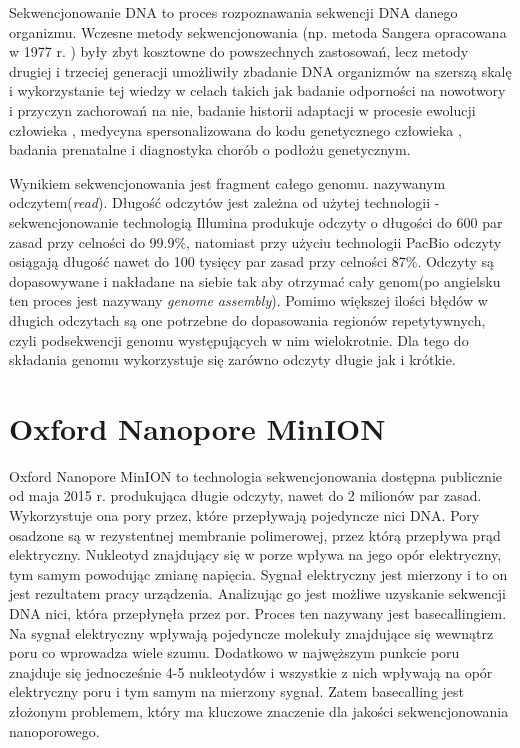 \documentclass[a4paper,11pt,twoside]{report}
\theoremstyle{definition}
\begin{document}
Sekwencjonowanie DNA to proces rozpoznawania sekwencji DNA danego organizmu. Wczesne metody sekwencjonowania (np. metoda Sangera opracowana w 1977 r. \cite{sequencingTechnologies}) były zbyt kosztowne do powszechnych zastosowań, lecz metody drugiej i trzeciej generacji umożliwiły zbadanie DNA organizmów na szerszą skalę i wykorzystanie tej wiedzy w celach takich jak badanie odporności na nowotwory\cite{cancerImmunity} i przyczyn zachorowań na nie\cite{cancerNonCoding}, badanie historii adaptacji w procesie ewolucji człowieka \cite{adaptation}, medycyna spersonalizowana do kodu genetycznego człowieka \cite{personalizedMedicine}, badania prenatalne \cite{prenatal} i diagnostyka chorób o podłożu genetycznym\cite{diagnosis}.

Wynikiem sekwencjonowania jest fragment całego genomu. nazywanym odczytem(\textit{read}). Długość odczytów jest zależna od użytej technologii - sekwencjonowanie technologią Illumina produkuje odczyty o długości do 600 par zasad przy celności do 99.9\%, natomiast przy użyciu technologii PacBio odczyty osiągają długość nawet do 100 tysięcy par zasad przy celności 87\%. Odczyty są dopasowywane i nakładane na siebie tak aby otrzymać cały genom(po angielsku ten proces jest nazywany \textit{genome assembly}).  Pomimo większej ilości błędów w długich odczytach są one potrzebne do dopasowania regionów repetytywnych, czyli podsekwencji genomu występujących w nim wielokrotnie. Dla tego do składania genomu wykorzystuje się zarówno odczyty długie jak i krótkie.

\section{Oxford Nanopore MinION}

Oxford Nanopore MinION to technologia sekwencjonowania dostępna publicznie od maja 2015 r. produkująca długie odczyty, nawet do 2 milionów par zasad. Wykorzystuje ona pory przez, które przepływają pojedyncze nici DNA. Pory osadzone są w rezystentnej membranie polimerowej, przez którą przepływa prąd elektryczny. Nukleotyd znajdujący się w porze wpływa na jego opór elektryczny, tym samym powodując zmianę napięcia. Sygnał elektryczny jest mierzony i to on jest rezultatem pracy urządzenia. Analizując go jest możliwe uzyskanie sekwencji DNA nici, która przepłynęła przez por. Proces ten nazywany jest basecallingiem. Na sygnał elektryczny wpływają pojedyncze molekuły znajdujące się wewnątrz poru co wprowadza wiele szumu. Dodatkowo w najwęższym punkcie poru znajduje się jednocześnie 4-5 nukleotydów i wszystkie z nich wpływają na opór elektryczny poru i tym samym na mierzony sygnał. Zatem basecalling jest złożonym problemem, który ma kluczowe znaczenie dla jakości sekwencjonowania nanoporowego.
\end{document}
